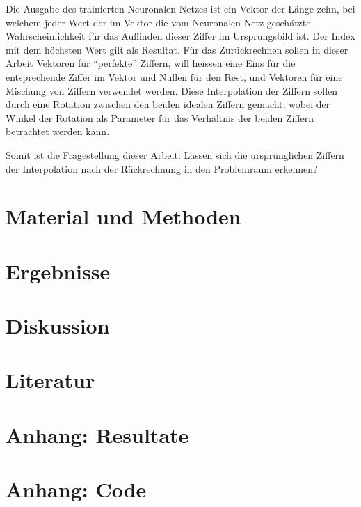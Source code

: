 \documentclass[a4paper,10pt]{article}
\newenvironment{Figure}
{\par\medskip\noindent\minipage{\linewidth}}
{\endminipage\par\medskip}
\begin{document}
\begin{multicols}{2}
\begin{Figure}
			\label{fig:feedbackwards}
		\end{Figure}
		Die Ausgabe des trainierten Neuronalen Netzes ist ein Vektor der Länge zehn, bei welchem jeder Wert der im Vektor die vom Neuronalen Netz geschätzte Wahrscheinlichkeit für das Auffinden dieser Ziffer im Ursprungsbild ist. Der Index mit dem höchsten Wert gilt als Resultat. Für das Zurückrechnen sollen in dieser Arbeit Vektoren für ``perfekte'' Ziffern, will heissen eine Eins für die entsprechende Ziffer im Vektor und Nullen für den Rest, und Vektoren für eine Mischung von Ziffern verwendet werden. Diese Interpolation der Ziffern sollen durch eine Rotation zwischen den beiden idealen Ziffern gemacht, wobei der Winkel der Rotation als Parameter für das Verhältnis der beiden Ziffern betrachtet werden kann.
		\par
		Somit ist die Fragestellung dieser Arbeit: Lassen sich die ursprünglichen Ziffern der Interpolation nach der Rückrechnung in den Problemraum erkennen?
		
		\section{Material und Methoden}
		
		\section{Ergebnisse}
		
		\section{Diskussion}
		
		\section{Literatur}
	\end{multicols}
	\newpage
	\appendix
	\section{Anhang: Resultate}
	
	\newpage
	\section{Anhang: Code}
\end{document}
